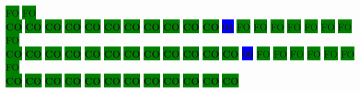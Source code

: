 \colorbox{green}{\color[gray]{0.75}FO}%
\colorbox{green}{\color[gray]{0.75}FO}%
\\
\colorbox{green}{\color[rgb]{0,0,0}\textbf{CO}}%
\colorbox{green}{\color[rgb]{0,0,0}\textbf{CO}}%
\colorbox{green}{\color[rgb]{0,0,0}\textbf{CO}}%
\colorbox{green}{\color[rgb]{0,0,0}\textbf{CO}}%
\colorbox{green}{\color[rgb]{0,0,0}\textbf{CO}}%
\colorbox{green}{\color[rgb]{0,0,0}\textbf{CO}}%
\colorbox{green}{\color[rgb]{0,0,0}\textbf{CO}}%
\colorbox{green}{\color[rgb]{0,0,0}\textbf{CO}}%
\colorbox{green}{\color[rgb]{0,0,0}\textbf{CO}}%
\colorbox{green}{\color[rgb]{0,0,0}\textbf{CO}}%
\colorbox{green}{\color[rgb]{0,0,0}\textbf{CO}}%
\colorbox{blue}{\color[rgb]{1,0,0}\textbf{04}}%
\colorbox{green}{\color[gray]{0.75}FO}%
\colorbox{green}{\color[gray]{0.75}FO}%
\colorbox{green}{\color[gray]{0.75}FO}%
\colorbox{green}{\color[gray]{0.75}FO}%
\colorbox{green}{\color[gray]{0.75}FO}%
\colorbox{green}{\color[gray]{0.75}FO}%
\colorbox{green}{\color[gray]{0.75}FO}%
\colorbox{green}{\color[gray]{0.75}FO}%
\\
\colorbox{green}{\color[rgb]{0,0,0}\textbf{CO}}%
\colorbox{green}{\color[rgb]{0,0,0}\textbf{CO}}%
\colorbox{green}{\color[rgb]{0,0,0}\textbf{CO}}%
\colorbox{green}{\color[rgb]{0,0,0}\textbf{CO}}%
\colorbox{green}{\color[rgb]{0,0,0}\textbf{CO}}%
\colorbox{green}{\color[rgb]{0,0,0}\textbf{CO}}%
\colorbox{green}{\color[rgb]{0,0,0}\textbf{CO}}%
\colorbox{green}{\color[rgb]{0,0,0}\textbf{CO}}%
\colorbox{green}{\color[rgb]{0,0,0}\textbf{CO}}%
\colorbox{green}{\color[rgb]{0,0,0}\textbf{CO}}%
\colorbox{green}{\color[rgb]{0,0,0}\textbf{CO}}%
\colorbox{green}{\color[rgb]{0,0,0}\textbf{CO}}%
\colorbox{blue}{\color[rgb]{1,0,0}\textbf{06}}%
\colorbox{green}{\color[gray]{0.75}FO}%
\colorbox{green}{\color[gray]{0.75}FO}%
\colorbox{green}{\color[gray]{0.75}FO}%
\colorbox{green}{\color[gray]{0.75}FO}%
\colorbox{green}{\color[gray]{0.75}FO}%
\colorbox{green}{\color[gray]{0.75}FO}%
\colorbox{green}{\color[gray]{0.75}FO}%
\\
\colorbox{green}{\color[rgb]{0,0,0}\textbf{CO}}%
\colorbox{green}{\color[rgb]{0,0,0}\textbf{CO}}%
\colorbox{green}{\color[rgb]{0,0,0}\textbf{CO}}%
\colorbox{green}{\color[rgb]{0,0,0}\textbf{CO}}%
\colorbox{green}{\color[rgb]{0,0,0}\textbf{CO}}%
\colorbox{green}{\color[rgb]{0,0,0}\textbf{CO}}%
\colorbox{green}{\color[rgb]{0,0,0}\textbf{CO}}%
\colorbox{green}{\color[rgb]{0,0,0}\textbf{CO}}%
\colorbox{green}{\color[rgb]{0,0,0}\textbf{CO}}%
\colorbox{green}{\color[rgb]{0,0,0}\textbf{CO}}%
\colorbox{green}{\color[rgb]{0,0,0}\textbf{CO}}%
\colorbox{green}{\color[rgb]{0,0,0}\textbf{CO}}%
